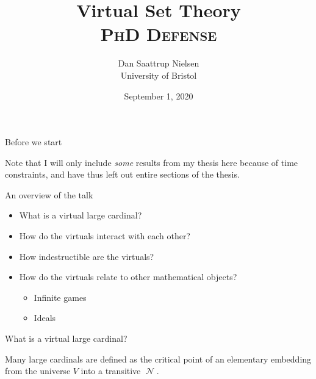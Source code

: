 \documentclass{beamer}
\title[Virtual Set Theory]{Virtual Set Theory\\ {\small\textsc{PhD Defense}}}
\author[Dan Saattrup Nielsen]{Dan Saattrup Nielsen\\ University of Bristol}
\date{September 1, 2020}
\DeclareMathOperator{\N}{\mathcal N}
\begin{document}
\begin{frame}
	\titlepage
\end{frame}

\begin{frame}{Before we start}

  Note that I will only include \textit{some} results from my thesis here because of time constraints, and have thus left out entire sections of the thesis.

\end{frame}

\begin{frame}{An overview of the talk}
  \begin{itemize}
    \item<alert@2> What is a virtual large cardinal?
    \item How do the virtuals interact with each other?
    \item How indestructible are the virtuals?
    \item How do the virtuals relate to other mathematical objects?
      \begin{itemize}
        \item Infinite games
        \item Ideals
      \end{itemize}
  \end{itemize}
\end{frame}

\begin{frame}{What is a virtual large cardinal?}

  Many large cardinals are defined as the \alert{critical point} of an elementary embedding from the universe $V$ into a transitive $\N$.

  \begin{center}
  \end{center}

\end{frame}
\end{document}
